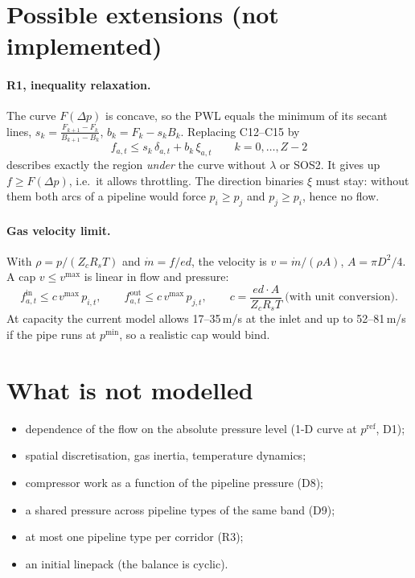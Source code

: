 \documentclass[11pt,a4paper]{article}
\newcommand{\pmin}{p^{\min}}
\newcommand{\pref}{p^{\mathrm{ref}}}
\newcommand{\fin}{f^{\mathrm{in}}}
\newcommand{\fout}{f^{\mathrm{out}}}
\begin{document}
\section{Possible extensions (not implemented)}

\paragraph{R1, inequality relaxation.} The curve $F(\Delta p)$ is concave, so
the PWL equals the minimum of its secant lines,
$s_k=\frac{F_{k+1}-F_k}{B_{k+1}-B_k}$, $b_k=F_k-s_kB_k$. Replacing C12--C15 by
\[
  f_{a,t}\le s_k\,\delta_{a,t} + b_k\,\xi_{a,t}\qquad k=0,\dots,Z-2
\]
describes exactly the region \emph{under} the curve without $\lambda$ or SOS2.
It gives up $f\ge F(\Delta p)$, i.e.\ it allows throttling. The direction
binaries $\xi$ must stay: without them both arcs of a pipeline would force
$p_i\ge p_j$ and $p_j\ge p_i$, hence no flow.

\paragraph{Gas velocity limit.} With $\rho=p/(Z_cR_sT)$ and
$\dot m=f/ed$, the velocity is $v=\dot m/(\rho A)$, $A=\pi D^2/4$. A cap
$v\le v^{\max}$ is linear in flow and pressure:
\[
  \fin_{a,t}\le c\,v^{\max}\,p_{i,t},\qquad
  \fout_{a,t}\le c\,v^{\max}\,p_{j,t},\qquad
  c=\frac{ed\cdot A}{Z_cR_sT}\ \text{(with unit conversion)}.
\]
At capacity the current model allows 17--35\,m/s at the inlet and up to
52--81\,m/s if the pipe runs at $\pmin$, so a realistic cap would bind.

\section{What is not modelled}
\begin{itemize}[leftmargin=*]
  \item dependence of the flow on the absolute pressure level (1-D curve at $\pref$, D1);
  \item spatial discretisation, gas inertia, temperature dynamics;
  \item compressor work as a function of the pipeline pressure (D8);
  \item a shared pressure across pipeline types of the same band (D9);
  \item at most one pipeline type per corridor (R3);
  \item an initial linepack (the balance is cyclic).
\end{itemize}
\end{document}
